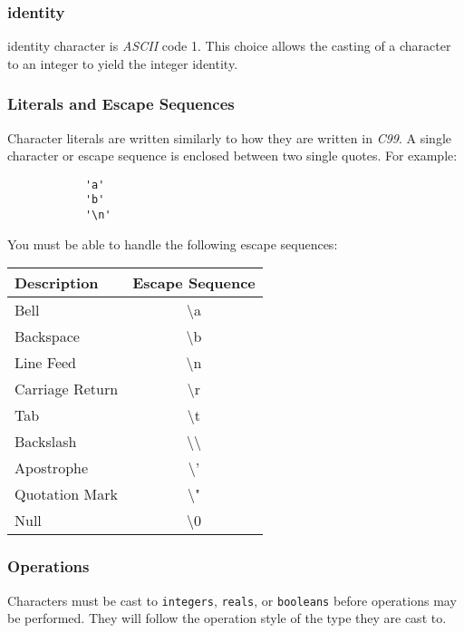 \documentclass[../../gazprea.tex]{subfiles}
\begin{document}
	\subsubsection{identity}

		\textsf{identity} character is \textit{ASCII} code 1. This choice allows the casting of a character to an
		integer to yield the integer identity.


	\subsubsection{Literals and Escape Sequences}

		Character literals are written similarly to how they are written in \textit{C99}. A single character or escape
		sequence is enclosed between two single quotes. For example:

		\begin{lstlisting}
			'a'
			'b'
			'\n'
		\end{lstlisting}

		You must be able to handle the following escape sequences:

		\begin{center}
			\begin{tabular}{|l|c|}
				\hline
				\textbf{Description} & \textbf{Escape Sequence} \\
				\hline
				Bell            & \textbackslash{}a \\
				Backspace       & \textbackslash{}b \\
				Line Feed       & \textbackslash{}n \\
				Carriage Return & \textbackslash{}r \\
				Tab             & \textbackslash{}t \\
				Backslash       & \textbackslash{}\textbackslash{} \\
				Apostrophe      & \textbackslash{}' \\
				Quotation Mark  & \textbackslash{}" \\
				Null            & \textbackslash0   \\
				\hline
			\end{tabular}
		\end{center}

	\subsubsection{Operations}

		Characters must be cast to \texttt{integers}, \texttt{reals}, or \texttt{booleans} before operations may be
		performed. They will follow the operation style of the type they are cast to.
\end{document}

